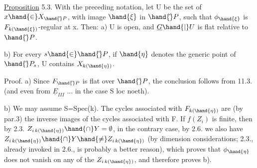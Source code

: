 
\uline{Proposition} 5.3. With the preceding notation, let U be the set of
$x\hand{\in} X_{\hand{\check{}}P}$, with image $\hand{\xi}$ in $\hand{\check{}}P$, such that $\phi_{\hand{\xi}}$ is $F_{k(\hand{\xi})}$-regular at x.  Then:
a)  U is open, and $\underline{G}\hand{|}U$ is flat relative to $\hand{\check{}}P$.

b) For every $s\hand{\in}\hand{\check{}}P$, if $\hand{\eta}$ denotes the generic point of $\hand{\check{}}P_s$, U contains
$X_{k(\hand{\eta})}$.

Proof. a) Since $F_{\hand{\check{}}P}$ is  flat over $\hand{\check{}}P$, the conclusion
follows from 11.3. (and even from $\underline{E}_{III}$ ... in the case S loc noeth).

b) We may assume S=Spec(k). The cycles associated with $F_{k(\hand{\eta})}$ are
(by par.3) the inverse images of the cycles  associated with F.  If $f(Z_i)$ is finite, then by 2.3. 
$Z_{i\,k(\hand{\eta})}\hand{\cap} Y = \emptyset$, in the contrary case, by 2.6. we also have
$Z_{i\,k(\hand{\eta})}\hand{\cap} Y \hand{\neq} Z_{i\,k(\hand{\eta})}$ (by dimension considerations; 2.3., already invoked
in 2.6., is probably a better reason), which proves that $\phi_{\hand{\eta}}$
does not vanish on any of the $Z_{i\,k(\hand{\eta})}$, and therefore proves b).


